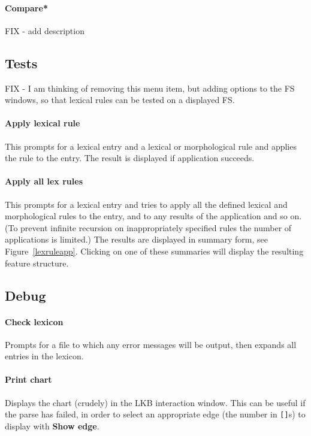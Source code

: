 \documentclass[12pt]{report}
\begin{document}
\paragraph{Compare*}
FIX - add description

\subsection{Tests}
\label{tests}

FIX - I am thinking of removing this menu item, but adding
options to the FS windows, so that lexical rules can be tested
on a displayed FS.

\paragraph{Apply lexical rule}
This prompts for a lexical entry and a lexical or morphological rule
and applies the rule to the entry.  The result is displayed if
application succeeds.  

\paragraph{Apply all lex rules}
This prompts for a lexical entry and tries to apply all the defined
lexical and morphological rules to the entry, and to any results of
the application and so on.  (To prevent infinite recursion on
inappropriately specified rules the number of applications is limited.)
The results are displayed in summary form,
see Figure~\ref{lexruleapp}.  Clicking on one of
these summaries will display the resulting feature structure.

\subsection{Debug}
\label{debug}

\paragraph{Check lexicon} Prompts for a file to which any
error messages will be output, then expands all entries in the lexicon.

\paragraph{Print chart}
Displays the chart (crudely) in the LKB interaction
window.  This can be useful if the parse has
failed, in order to select an appropriate edge 
(the number in \verb+[]+s) to display with {\bf
Show edge}.
\end{document}
